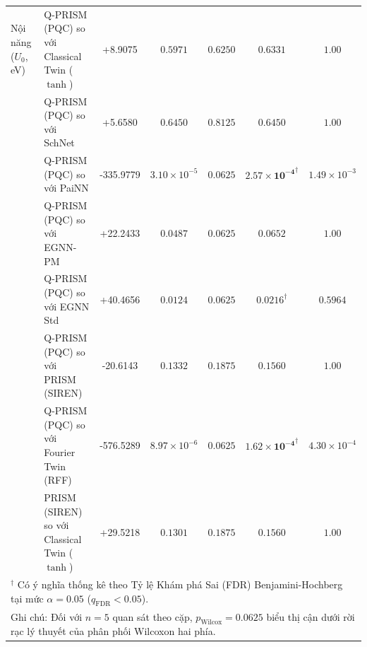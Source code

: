 \begin{table}[p]
{\begin{tabular}{llccccc}
\midrule
Nội năng ($U_0$, eV) & Q-PRISM (PQC) so với Classical Twin ($\tanh$) & +8.9075 & $0.5971$ & $0.6250$ & $0.6331$ & $1.00$ \\
 & Q-PRISM (PQC) so với SchNet & +5.6580 & $0.6450$ & $0.8125$ & $0.6450$ & $1.00$ \\
 & Q-PRISM (PQC) so với PaiNN & -335.9779 & $3.10 \times 10^{-5}$ & $0.0625$ & $\mathbf{2.57 \times 10^{-4}}^{\dagger}$ & $1.49 \times 10^{-3}$ \\
 & Q-PRISM (PQC) so với EGNN-PM & +22.2433 & $0.0487$ & $0.0625$ & $0.0652$ & $1.00$ \\
 & Q-PRISM (PQC) so với EGNN Std & +40.4656 & $0.0124$ & $0.0625$ & $\mathbf{0.0216}^{\dagger}$ & $0.5964$ \\
 & Q-PRISM (PQC) so với PRISM (SIREN) & -20.6143 & $0.1332$ & $0.1875$ & $0.1560$ & $1.00$ \\
 & Q-PRISM (PQC) so với Fourier Twin (RFF) & -576.5289 & $8.97 \times 10^{-6}$ & $0.0625$ & $\mathbf{1.62 \times 10^{-4}}^{\dagger}$ & $4.30 \times 10^{-4}$ \\
 & PRISM (SIREN) so với Classical Twin ($\tanh$) & +29.5218 & $0.1301$ & $0.1875$ & $0.1560$ & $1.00$ \\
\bottomrule
\multicolumn{7}{l}{\footnotesize $^{\dagger}$ Có ý nghĩa thống kê theo Tỷ lệ Khám phá Sai (FDR) Benjamini-Hochberg tại mức $\alpha = 0.05$ ($q_{\mathrm{FDR}} < 0.05$).} \\
\multicolumn{7}{l}{\footnotesize Ghi chú: Đối với $n = 5$ quan sát theo cặp, $p_{\mathrm{Wilcox}} = 0.0625$ biểu thị cận dưới rời rạc lý thuyết của phân phối Wilcoxon hai phía.} \\
\end{tabular}%
}
\end{table}
